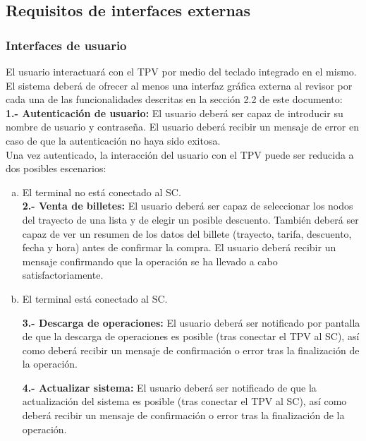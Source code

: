 \subsection{Requisitos de interfaces externas}

\subsubsection{Interfaces de usuario}

El usuario interactuará con el TPV por medio del teclado integrado en el mismo. El sistema deberá de ofrecer al menos una interfaz gráfica externa al revisor por cada una de las funcionalidades descritas en la sección 2.2 de este documento:\\

\textbf{1.- Autenticación de usuario:} El usuario deberá ser capaz de introducir su nombre de usuario y contraseña. El usuario deberá recibir un mensaje de error en caso de que la autenticación no haya sido exitosa.\\

Una vez autenticado, la interacción del usuario con el TPV puede ser reducida a dos posibles escenarios:

\begin{enumerate}[(a)]
\item El terminal no está conectado al SC.\\

\textbf{2.- Venta de billetes:} El usuario deberá ser capaz de seleccionar los nodos del trayecto de una lista y de elegir un posible descuento. También deberá ser capaz de ver un resumen de los datos del billete (trayecto, tarifa, descuento, fecha y hora) antes de confirmar la compra. El usuario deberá recibir un mensaje confirmando que la operación se ha llevado a cabo satisfactoriamente.

\item El terminal está conectado al SC.

\textbf{3.- Descarga de operaciones:} El usuario deberá ser notificado por pantalla de que la descarga de operaciones es posible (tras conectar el TPV al SC), así como deberá recibir un mensaje de confirmación o error tras la finalización de la operación.

\textbf{4.- Actualizar sistema:} El usuario deberá ser notificado de que la actualización del sistema es posible (tras conectar el TPV al SC), así como deberá recibir un mensaje de confirmación o error tras la finalización de la operación.

\end{enumerate}

